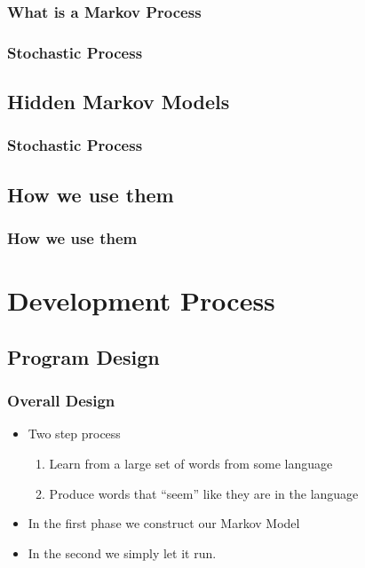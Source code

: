 \documentclass{beamer}
\begin{document}
\begin{frame}
   \frametitle{What is a Markov Process}
\end{frame}

\begin{frame}
   \frametitle{}
\end{frame}

\begin{frame}
   \frametitle{Stochastic Process}
\end{frame}

\subsection{Hidden Markov Models}
\begin{frame}
   \frametitle{}
\end{frame}

\begin{frame}
   \frametitle{Stochastic Process}
\end{frame}

\subsection{How we use them}
\begin{frame}
   \frametitle{How we use them}
\end{frame}

\section{Development Process}

\subsection{Program Design}
\begin{frame}
   \frametitle{Overall Design}
   \begin{itemize}
      \item Two step process
      \begin{enumerate}
         \item Learn from a large set of words from some language
         \item Produce words that ``seem'' like they are in the language
      \end{enumerate}
      \item In the first phase we construct our Markov Model
      \item In the second we simply let it run.
   \end{itemize}
\end{frame}
\end{document}
